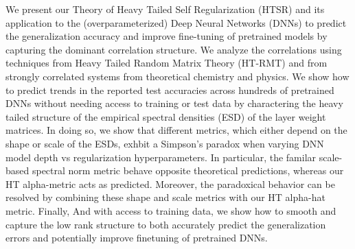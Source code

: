 We present our Theory of Heavy Tailed Self Regularization (HTSR) and
its application to the (overparameterized)  Deep Neural Networks (DNNs) 
to  predict the generalization accuracy and improve fine-tuning
of pretrained models by capturing the dominant correlation structure.
We analyze the correlations using techniques from 
Heavy Tailed Random Matrix Theory (HT-RMT)
and from  strongly correlated systems from theoretical
chemistry and  physics.  
We show how to predict trends in the reported test accuracies
across hundreds of pretrained DNNs without needing access
to training or test data by charactering the heavy tailed
structure of the empirical spectral densities (ESD) of 
the layer weight matrices.
In doing so, we show that different metrics, which
either depend on the shape or scale of the ESDs,
exhbit a Simpson's paradox when varying DNN model depth
vs regularization hyperparameters.
In particular,  the familar scale-based spectral norm
metric behave opposite theoretical predictions,
whereas our HT alpha-metric acts as predicted.
Moreover, the paradoxical behavior  can be resolved
by combining these shape and scale metrics with
our HT alpha-hat metric.
Finally,  And with access to training data, we show how to
smooth and capture the low rank structure to both accurately
predict the generalization errors and potentially improve
finetuning of pretrained DNNs.



